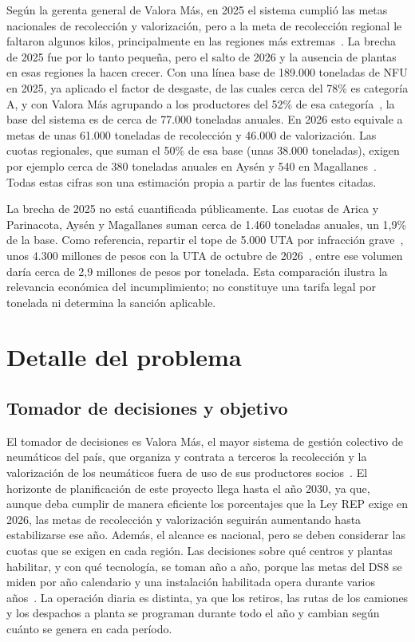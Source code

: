 \documentclass[letterpaper]{article}
\begin{document}
Según la gerenta general de Valora Más, en 2025 el sistema cumplió las metas nacionales de recolección y valorización, pero a la meta de recolección regional le faltaron algunos kilos, principalmente en las regiones más extremas~\cite{paiscircular2026}. La brecha de 2025 fue por lo tanto pequeña, pero el salto de 2026 y la ausencia de plantas en esas regiones la hacen crecer. Con una línea base de 189.000 toneladas de NFU en 2025, ya aplicado el factor de desgaste, de las cuales cerca del 78\% es categoría A, y con Valora Más agrupando a los productores del 52\% de esa categoría~\cite{kyklos2026}, la base del sistema es de cerca de 77.000 toneladas anuales. En 2026 esto equivale a metas de unas 61.000 toneladas de recolección y 46.000 de valorización. Las cuotas regionales, que suman el 50\% de esa base (unas 38.000 toneladas), exigen por ejemplo cerca de 380 toneladas anuales en Aysén y 540 en Magallanes~\cite{DS8}. Todas estas cifras son una estimación propia a partir de las fuentes citadas.

La brecha de 2025 no está cuantificada públicamente. Las cuotas de Arica y Parinacota, Aysén y Magallanes suman cerca de 1.460 toneladas anuales, un 1,9\% de la base. Como referencia, repartir el tope de 5.000 UTA por infracción grave~\cite{leyrep20920}, unos 4.300 millones de pesos con la UTA de octubre de 2026~\cite{sii2026}, entre ese volumen daría cerca de 2,9 millones de pesos por tonelada. Esta comparación ilustra la relevancia económica del incumplimiento; no constituye una tarifa legal por tonelada ni determina la sanción aplicable.


\section{Detalle del problema}

\subsection{Tomador de decisiones y objetivo}

El tomador de decisiones es Valora Más, el mayor sistema de gestión colectivo de neumáticos del país, que organiza y contrata a terceros la recolección y la valorización de los neumáticos fuera de uso de sus productores socios~\cite{paiscircular2026}. El horizonte de planificación de este proyecto llega hasta el año 2030, ya que, aunque deba cumplir de manera eficiente los porcentajes que la Ley REP exige en 2026, las metas de recolección y valorización seguirán aumentando hasta estabilizarse ese año. Además, el alcance es nacional, pero se deben considerar las cuotas que se exigen en cada región. Las decisiones sobre qué centros y plantas habilitar, y con qué tecnología, se toman año a año, porque las metas del DS8 se miden por año calendario y una instalación habilitada opera durante varios años~\cite{DS8}. La operación diaria es distinta, ya que los retiros, las rutas de los camiones y los despachos a planta se programan durante todo el año y cambian según cuánto se genera en cada período.
\end{document}
